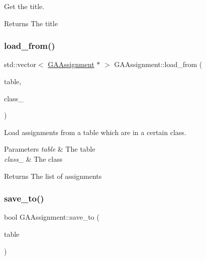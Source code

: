 Get the title. 

\begin{DoxyReturn}{Returns}
The title 
\end{DoxyReturn}
\mbox{\label{class_g_a_assignment_a167d821c1311025490e4bbbbac6d8ad4}} 
\subsubsection{\texorpdfstring{load\+\_\+from()}{load\_from()}}
{\footnotesize\ttfamily std\+::vector$<$ \hyperlink{class_g_a_assignment}{G\+A\+Assignment} $\ast$ $>$ G\+A\+Assignment\+::load\+\_\+from (\begin{DoxyParamCaption}\item[{\hyperlink{class_database_table}{Database\+Table} $\ast$}]{table,  }\item[{\hyperlink{class_g_a_class}{G\+A\+Class} $\ast$}]{class\+\_\+ }\end{DoxyParamCaption})\hspace{0.3cm}{\ttfamily [static]}}



Load assignments from a table which are in a certain class. 


\begin{DoxyParams}{Parameters}
{\em table} & The table \\
\hline
{\em class\+\_\+} & The class \\
\hline
\end{DoxyParams}
\begin{DoxyReturn}{Returns}
The list of assignments 
\end{DoxyReturn}
\mbox{\label{class_g_a_assignment_a2481b0469431c06bf4d28f588e3c8cf4}} 
\subsubsection{\texorpdfstring{save\+\_\+to()}{save\_to()}}
{\footnotesize\ttfamily bool G\+A\+Assignment\+::save\+\_\+to (\begin{DoxyParamCaption}\item[{\hyperlink{class_database_table}{Database\+Table} $\ast$}]{table }\end{DoxyParamCaption})}




